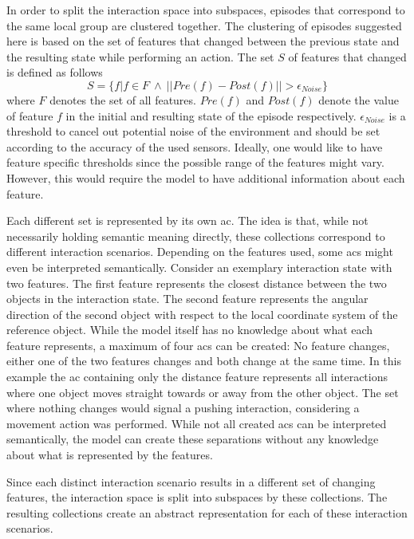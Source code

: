 In order to split the interaction space into subspaces, episodes that correspond to the same local group are clustered together.
The clustering of episodes suggested here is based on the set of features that changed between the previous state and the resulting state while performing an action. The set $S$ of features that changed is defined as follows 
\begin{equation}
S = \{f | f \in F ~ \wedge ~ ||Pre(f)-Post(f)|| > \epsilon_{Noise}\}
\label{eq:difSet}
\end{equation}
where $F$ denotes the set of all features. $Pre(f)$ and $Post(f)$ denote the value of 
feature $f$ in the initial and resulting state of the episode respectively. $\epsilon_{Noise}$ is a threshold to cancel out potential noise of the environment and should be set according to the accuracy of the used sensors. Ideally, one would like to have feature specific thresholds since the possible range of the features might vary. However, this would require the model to have additional information about each feature.

Each different set is represented by its own \gls{ac}. The 
idea is that, while not necessarily holding semantic meaning directly, these collections correspond to different interaction scenarios. Depending on the features used, some \glspl{ac} might even be interpreted semantically.
Consider an exemplary interaction state with two features. The first feature represents the closest distance between the two objects in the interaction state. The second feature represents the angular direction of the second object with respect to the local coordinate system of the reference object. While the model itself has no knowledge about what each feature represents, a maximum of four \glspl{ac} can be created: No feature changes, either one of the two features changes and both change at the same time. In this example the \gls{ac} containing only the distance feature represents all interactions where one object moves straight towards or away from the other object. The set where nothing changes would signal a pushing interaction, considering a movement action was performed. While not all created \glspl{ac} can be interpreted semantically, the model can create these separations without any knowledge about what is represented by the features.

Since each distinct interaction scenario results in a different set of changing features, the interaction space is split into subspaces by these collections. The resulting collections create an abstract representation for each of these interaction scenarios. 

